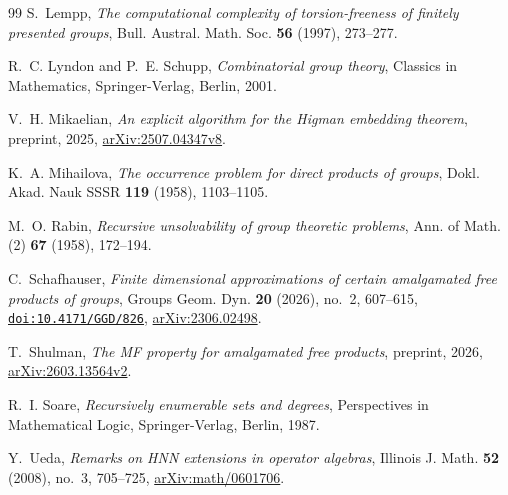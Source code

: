 \documentclass[11pt]{amsart}
\newcommand{\doi}[1]{\href{https://doi.org/#1}{\nolinkurl{doi:#1}}}
\theoremstyle{remark}
\theoremstyle{plain}
\begin{document}
\begin{thebibliography}{99}
S.~Lempp,
\emph{The computational complexity of torsion-freeness of finitely presented groups},
Bull. Austral. Math. Soc. \textbf{56} (1997), 273--277.

R.~C. Lyndon and P.~E. Schupp,
\emph{Combinatorial group theory},
Classics in Mathematics, Springer-Verlag, Berlin, 2001.

V.~H. Mikaelian,
\emph{An explicit algorithm for the Higman embedding theorem},
preprint, 2025,
\href{https://arxiv.org/abs/2507.04347v8}{arXiv:2507.04347v8}.

K.~A. Mihailova,
\emph{The occurrence problem for direct products of groups},
Dokl. Akad. Nauk SSSR \textbf{119} (1958), 1103--1105.

M.~O. Rabin,
\emph{Recursive unsolvability of group theoretic problems},
Ann. of Math. (2) \textbf{67} (1958), 172--194.

C.~Schafhauser,
\emph{Finite dimensional approximations of certain amalgamated free
products of groups},
Groups Geom. Dyn. \textbf{20} (2026), no.~2, 607--615,
\doi{10.4171/GGD/826},
\href{https://arxiv.org/abs/2306.02498}{arXiv:2306.02498}.

T.~Shulman,
\emph{The MF property for amalgamated free products},
preprint, 2026,
\href{https://arxiv.org/abs/2603.13564v2}{arXiv:2603.13564v2}.

R.~I. Soare,
\emph{Recursively enumerable sets and degrees},
Perspectives in Mathematical Logic, Springer-Verlag, Berlin, 1987.

Y.~Ueda,
\emph{Remarks on HNN extensions in operator algebras},
Illinois J. Math. \textbf{52} (2008), no.~3, 705--725,
\href{https://arxiv.org/abs/math/0601706}{arXiv:math/0601706}.

\end{thebibliography}
\end{document}
